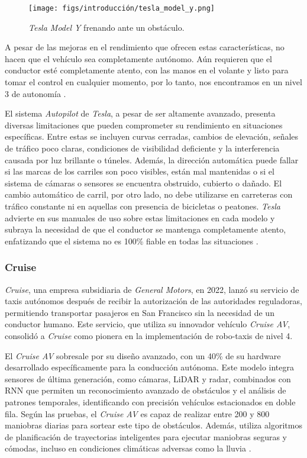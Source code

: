 \newpage

\begin{figure}[ht]
  \begin{center}
    \texttt{[image: figs/introducción/tesla\_model\_y.png]}
  \end{center}
  \caption{\textit{Tesla Model Y} frenando ante un obstáculo.}
  \label{tesla}
\end{figure}

A pesar de las mejoras en el rendimiento que ofrecen estas características, no hacen que el vehículo sea completamente autónomo. Aún requieren que el conductor esté completamente atento, con las manos en el volante y listo para tomar el control en cualquier momento, por lo tanto, nos encontramos en un nivel 3 de autonomía \cite{tesla-autopilot}.

El sistema \textit{Autopilot} de \textit{Tesla}, a pesar de ser altamente avanzado, presenta diversas limitaciones que pueden comprometer su rendimiento en situaciones específicas. Entre estas se incluyen curvas cerradas, cambios de elevación, señales de tráfico poco claras, condiciones de visibilidad deficiente y la interferencia causada por luz brillante o túneles. Además, la dirección automática puede fallar si las marcas de los carriles son poco visibles, están mal mantenidas o si el sistema de cámaras o sensores se encuentra obstruido, cubierto o dañado. El cambio automático de carril, por otro lado, no debe utilizarse en carreteras con tráfico constante ni en aquellas con presencia de bicicletas o peatones. \textit{Tesla} advierte en sus manuales de uso sobre estas limitaciones en cada modelo y subraya la necesidad de que el conductor se mantenga completamente atento, enfatizando que el sistema no es 100\% fiable en todas las situaciones \cite{tesla-limitations}.

\subsubsection{Cruise}

\textit{Cruise}, una empresa subsidiaria de \textit{General Motors}, en 2022, lanzó su servicio de taxis autónomos después de recibir la autorización de las autoridades reguladoras, permitiendo transportar pasajeros en San Francisco sin la necesidad de un conductor humano. Este servicio, que utiliza su innovador vehículo \textit{Cruise AV}, consolidó a \textit{Cruise} como pionera en la implementación de robo-taxis de nivel 4. 

El \textit{Cruise AV} sobresale por su diseño avanzado, con un 40\% de su hardware desarrollado específicamente para la conducción autónoma. Este modelo integra sensores de última generación, como cámaras, \ac{LiDAR} y radar, combinados con \ac{RNN} que permiten un reconocimiento avanzado de obstáculos y el análisis de patrones temporales, identificando con precisión vehículos estacionados en doble fila. Según las pruebas, el \textit{Cruise AV} es capaz de realizar entre 200 y 800 maniobras diarias para sortear este tipo de obstáculos. Además, utiliza algoritmos de planificación de trayectorias inteligentes para ejecutar maniobras seguras y cómodas, incluso en condiciones climáticas adversas como la lluvia \cite{cruise}.

